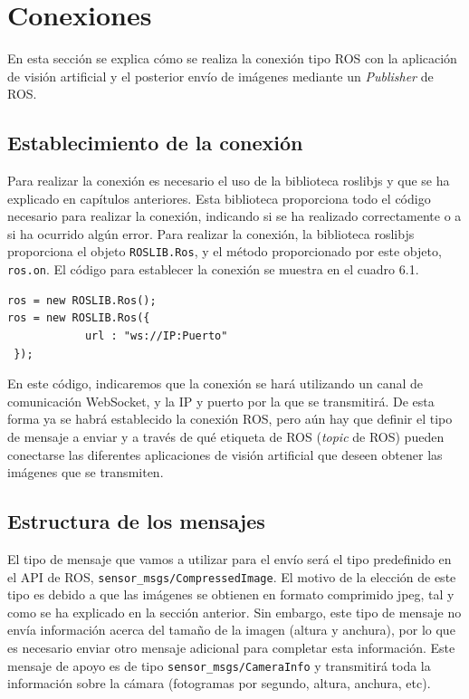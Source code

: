 \section{Conexiones}
En esta sección se explica cómo se realiza la conexión tipo ROS con la aplicación de visión artificial y el posterior envío de imágenes mediante un \textit{Publisher} de ROS. 

\subsection{Establecimiento de la conexión}
Para realizar la conexión es necesario el uso de la biblioteca roslibjs y que se ha explicado en capítulos anteriores. Esta biblioteca proporciona todo el código necesario para realizar la conexión, indicando si se ha realizado correctamente o a si ha ocurrido algún error. Para realizar la conexión, la biblioteca roslibjs proporciona el objeto \texttt{ROSLIB.Ros}, y el método proporcionado por este objeto, \texttt{ros.on}. El código para establecer la conexión se muestra en el cuadro 6.1.
\begin{lstlisting}[caption= Establecer conexión con ROS, label=cod.conexionRosCamserver]
ros = new ROSLIB.Ros();
ros = new ROSLIB.Ros({
            url : "ws://IP:Puerto"
 });
\end{lstlisting}
En este código, indicaremos que la conexión se hará utilizando un canal de comunicación WebSocket, y la IP y puerto por la que se transmitirá. De esta forma ya se habrá establecido la conexión ROS, pero aún hay que definir el tipo de mensaje a enviar y a través de qué etiqueta de ROS (\textit{topic} de ROS) pueden conectarse las diferentes aplicaciones de visión artificial que deseen obtener las imágenes que se transmiten.

\subsection{Estructura de los mensajes}
El tipo de mensaje que vamos a utilizar para el envío será el tipo predefinido en el API de ROS, \texttt{sensor\_msgs/CompressedImage}. El motivo de la elección de este tipo es debido a que las imágenes se obtienen en formato comprimido jpeg, tal y como se ha explicado en la sección anterior. Sin embargo, este tipo de mensaje no envía información acerca del tamaño de la imagen (altura y anchura), por lo que es necesario enviar otro mensaje adicional para completar esta información. Este mensaje de apoyo es de tipo \texttt{sensor\_msgs/CameraInfo} y transmitirá toda la información sobre la cámara (fotogramas por segundo, altura, anchura, etc). 


